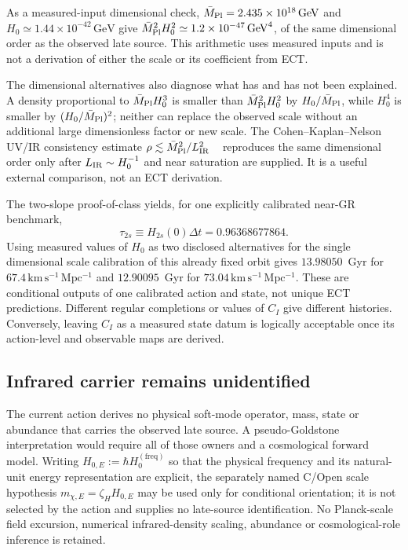 As a measured-input dimensional check,
$\bar M_{\rm Pl}=2.435\times10^{18}\,\mathrm{GeV}$ and
$H_0\simeq1.44\times10^{-42}\,\mathrm{GeV}$ give
$\bar M_{\rm Pl}^2H_0^2\simeq1.2\times10^{-47}\,\mathrm{GeV}^4$, of the
same dimensional order as the observed late source.  This arithmetic uses
measured inputs and is not a derivation of either the scale or its
coefficient from ECT.

The dimensional alternatives also diagnose what has and has not been
explained.  A density proportional to $\bar M_{\rm Pl}H_0^3$ is smaller than
$\bar M_{\rm Pl}^2H_0^2$ by $H_0/\bar M_{\rm Pl}$, while $H_0^4$ is smaller
by $(H_0/\bar M_{\rm Pl})^2$; neither can replace the observed scale without
an additional large dimensionless factor or new scale.  The
Cohen--Kaplan--Nelson UV/IR consistency estimate
$\rho\lesssim \bar M_{\rm Pl}^2/L_{\rm IR}^2$
~\cite{CohenKaplanNelson1999} reproduces the same dimensional order only
after $L_{\rm IR}\sim H_0^{-1}$ and near saturation are supplied.  It is a
useful external comparison, not an ECT derivation.

The two-slope proof-of-class yields, for one explicitly calibrated
near-GR benchmark,
\begin{equation}
 \tau_{2s}\equiv H_{2s}(0)\Delta t=0.96368677864.
 \label{eq:cc_conditional_age}
\end{equation}
Using measured values of $H_0$ as two disclosed alternatives for the single
dimensional scale calibration of this already fixed orbit gives
$13.98050$~Gyr for $67.4\,\mathrm{km\,s^{-1}\,Mpc^{-1}}$ and
$12.90095$~Gyr for $73.04\,\mathrm{km\,s^{-1}\,Mpc^{-1}}$.  These are
conditional outputs of one calibrated action and state, not unique ECT
predictions.  Different regular completions or values of $C_I$ give
different histories.  Conversely, leaving $C_I$ as a measured state datum
is logically acceptable once its action-level and observable maps are
derived.

\subsection{Infrared carrier remains unidentified}
\label{subsec:goldstone_cc}

The current action derives no physical soft-mode operator, mass, state or
abundance that carries the observed late source.  A pseudo-Goldstone
interpretation would require all of those owners and a cosmological
forward model.  Writing $H_{0,E}:=\hbar H_0^{(\mathrm{freq})}$ so that the
physical frequency and its natural-unit energy representation are explicit,
the separately named C/Open scale hypothesis
$m_{\chi,E}=\zeta_HH_{0,E}$ may be used only for conditional orientation;
it is not selected by the action and supplies no late-source identification.
No Planck-scale field excursion, numerical infrared-density scaling,
abundance or cosmological-role inference is retained.

